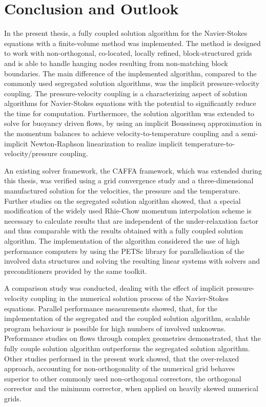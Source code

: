 \section{Conclusion and Outlook}
\label{sec:conclusion}

In the present thesis, a fully coupled solution algorithm for the Navier-Stokes equations with a finite-volume method was implemented. The method is designed to work with non-orthogonal, co-located, locally refined, block-structured grids and is able to handle hanging nodes resulting from non-matching block boundaries. The main difference of the implemented algorithm, compared to the commonly used segregated solution algorithms, was the implicit pressure-velocity coupling. The pressure-velocity coupling is a characterizing aspect of solution algorithms for Navier-Stokes equations with the potential to significantly reduce the time for computation. Furthermore, the solution algorithm was extended to solve for buoyancy driven flows, by using an implicit Boussinesq approximation in the momentum balances to achieve velocity-to-temperature coupling and a semi-implicit Newton-Raphson linearization to realize implicit temperature-to-velocity/pressure coupling.

An existing solver framework, the CAFFA framework, which was extended during this thesis, was verified using a grid convergence study and a three-dimensional manufactured solution for the velocities, the pressure and the temperature. Further studies on the segregated solution algorithm showed, that a special modification of the widely used Rhie-Chow momentum interpolation scheme is necessary to calculate results that are independent of the under-relaxation factor and thus comparable with the results obtained with a fully coupled solution algorithm. The implementation of the algorithm considered the use of high performance computers by using the PETSc library for parallelisation of the involved data structures and solving the resulting linear systems with solvers and preconditioners provided by the same toolkit.

A comparison study was conducted, dealing with the effect of implicit pressure-velocity coupling in the numerical solution process of the Navier-Stokes equations. Parallel performance measurements showed, that, for the implementation of the segregated and the coupled solution algorithm, scalable program behaviour is possible for high numbers of involved unknowns. Performance studies on flows through complex geometries demonstrated, that the fully couple solution algorithm outperforms the segregated solution algorithm. Other studies performed in the present work showed, that the over-relaxed approach, accounting for non-orthogonality of the numerical grid behaves superior to other commonly used non-orthogonal correctors, the orthogonal corrector and the minimum corrector, when applied on heavily skewed numerical grids.

